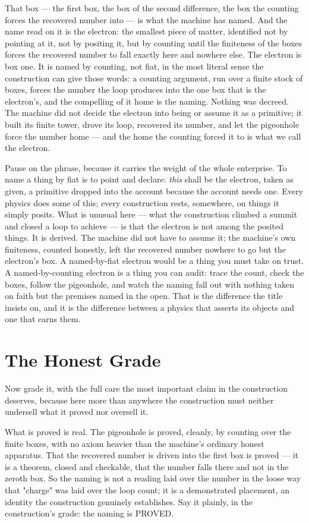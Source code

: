 That box --- the first box, the box of the second difference, the box the counting forces the recovered number
into --- is what the machine has named. And the name read on it is the electron: the smallest piece of
matter, identified not by pointing at it, not by positing it, but by counting until the finiteness of the boxes
forces the recovered number to fall exactly here and nowhere else. The electron is box one. It is named by
counting, not fiat, in the most literal sense the construction can give those words: a counting argument, run over a
finite stock of boxes, forces the number the loop produces into the one box that is the electron's, and the
compelling of it home is the naming. Nothing was decreed. The machine did not decide the electron into being or assume it as a
primitive; it built its finite tower, drove its loop, recovered its number, and let the pigeonhole force the
number home --- and the home the counting forced it to is what we call the electron.

Pause on the phrase, because it carries the weight of the whole enterprise. To name a thing by fiat is to point
and declare: \emph{this} shall be the electron, taken as given, a primitive dropped into the account because the
account needs one. Every physics does some of this; every construction rests, somewhere, on things it simply
posits. What is unusual here --- what the construction climbed a summit and closed a loop to achieve --- is that the
electron is not among the posited things. It is derived. The machine did not have to assume it; the machine's own
finiteness, counted honestly, left the recovered number nowhere to go but the electron's box. A named-by-fiat
electron would be a thing you must take on trust. A named-by-counting electron is a thing you can audit: trace the
count, check the boxes, follow the pigeonhole, and watch the naming fall out with nothing taken on faith but the
premises named in the open. That is the difference the title insists on, and it is the difference
between a physics that asserts its objects and one that earns them.

\section{The Honest Grade}

Now grade it, with the full care the most important claim in the construction deserves, because here more than anywhere
the construction must neither undersell what it proved nor oversell it.

What is proved is real. The pigeonhole is proved, cleanly, by counting over the finite boxes, with no axiom
heavier than the machine's ordinary honest apparatus. That the recovered number is driven into the first box is
proved --- it is a theorem, closed and checkable, that the number falls there and not in the zeroth box. So the
naming is not a reading laid over the number in the loose way that "charge" was laid over the loop count; it is a
demonstrated placement, an identity the construction genuinely establishes. Say it plainly, in the construction's grade:
the naming is PROVED.

